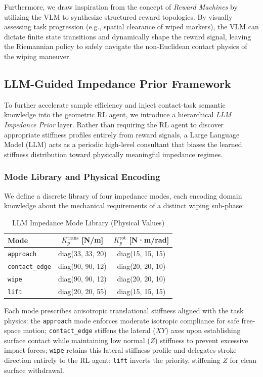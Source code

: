 \documentclass[letterpaper, 10 pt, conference]{IEEEtran}
\begin{document}
Furthermore, we draw inspiration from the concept of \textit{Reward Machines} by utilizing the VLM to synthesize structured reward topologies. By visually assessing task progression (e.g., spatial clearance of wiped markers), the VLM can dictate finite state transitions and dynamically shape the reward signal, leaving the Riemannian policy to safely navigate the non-Euclidean contact physics of the wiping maneuver.

\subsection{LLM-Guided Impedance Prior Framework}
\label{sec:llm_framework}

To further accelerate sample efficiency and inject contact-task semantic knowledge into
the geometric RL agent, we introduce a hierarchical \textit{LLM Impedance Prior} layer.
Rather than requiring the RL agent to discover appropriate stiffness profiles
entirely from reward signals, a Large Language Model (LLM) acts as a periodic
high-level consultant that biases the learned stiffness distribution toward
physically meaningful impedance regimes.

\subsubsection{Mode Library and Physical Encoding}
We define a discrete library of four impedance modes, each encoding domain knowledge
about the mechanical requirements of a distinct wiping sub-phase:

\begin{table}[h]
\centering
\caption{LLM Impedance Mode Library (Physical Values)}
\label{tab:impedance_modes}
\begin{tabular}{@{}lcc@{}}
\toprule
\textbf{Mode} & \textbf{$K_p^{\text{trans}}$ [N/m]} & \textbf{$K_p^{\text{rot}}$ [N·m/rad]} \\ \midrule
\texttt{approach}     & diag(33, 33, 20) & diag(15, 15, 15) \\
\texttt{contact\_edge}& diag(90, 90, 12) & diag(20, 20, 10) \\
\texttt{wipe}         & diag(90, 90, 12) & diag(20, 20, 10) \\
\texttt{lift}         & diag(20, 20, 55) & diag(15, 15, 15) \\
\bottomrule
\end{tabular}
\end{table}

Each mode prescribes anisotropic translational stiffness aligned with the task
physics: the \texttt{approach} mode enforces moderate isotropic compliance for
safe free-space motion; \texttt{contact\_edge} stiffens the lateral ($XY$) axes
upon establishing surface contact while maintaining low normal ($Z$) stiffness
to prevent excessive impact forces; \texttt{wipe} retains this lateral stiffness
profile and delegates stroke direction entirely to the RL agent; \texttt{lift}
inverts the priority, stiffening $Z$ for clean surface withdrawal.
\end{document}
